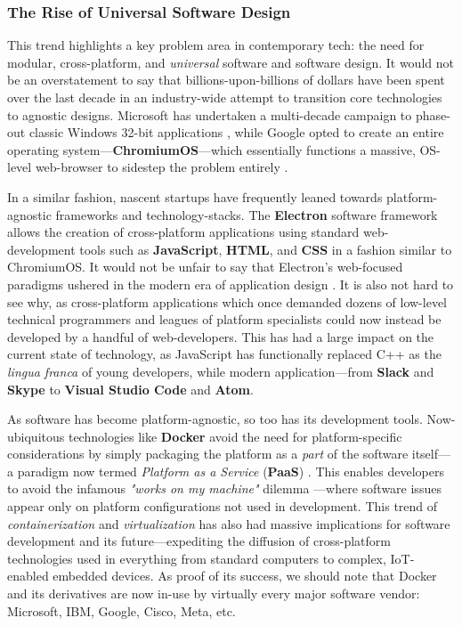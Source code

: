 \documentclass{report}
\newcommand{\tech}[1]{\textbf{#1}}
\begin{document}
\subsubsection{The Rise of Universal Software Design}

This trend highlights a key problem area in contemporary tech: the need for modular, cross-platform, and \emph{universal} software and software design. It would not be an overstatement to say that billions-upon-billions of dollars have been spent over the last decade in an industry-wide attempt to transition core technologies to agnostic designs. Microsoft has undertaken a multi-decade campaign to phase-out classic Windows 32-bit applications \cite{Foley_2020}, while Google opted to create an entire operating system---\tech{ChromiumOS}---which essentially functions a massive, OS-level web-browser to sidestep the problem entirely \cite{chrome}. 

In a similar fashion, nascent startups have frequently leaned towards platform-agnostic frameworks and technology-stacks. The \tech{Electron} software framework allows the creation of cross-platform applications using standard web-development tools such as \tech{JavaScript}, \tech{HTML}, and \tech{CSS} in a fashion similar to ChromiumOS. It would not be unfair to say that Electron's web-focused paradigms ushered in the modern era of application design \cite{Alexander_2024}. It is also not hard to see why, as cross-platform applications which once demanded dozens of low-level technical programmers and leagues of platform specialists could now instead be developed by a handful of web-developers. This has had a large impact on the current state of technology, as JavaScript has functionally replaced C++ as the \emph{lingua franca} of young developers, while modern application---from \tech{Slack} and \tech{Skype} to \tech{Visual Studio Code} and \tech{Atom}.  

As software has become platform-agnostic, so too has its development tools. Now-ubiquitous technologies like \tech{Docker} avoid the need for platform-specific considerations by simply packaging the platform as a \emph{ part} of the software itself---a paradigm now termed \emph{Platform as a Service} (\tech{PaaS}) \cite{kolb2019portability}. This enables developers to avoid the infamous \emph{"works on my machine"} dilemma \cite{Yadav_2021}---where software issues appear only on platform configurations not used in development. This trend of \emph{containerization} and \emph{virtualization} has also had massive implications for software development and its future---expediting the diffusion of cross-platform technologies used in everything from standard computers to complex, IoT-enabled embedded devices. As proof of its success, we should note that Docker and its derivatives are now in-use by virtually every major software vendor: Microsoft, IBM, Google, Cisco, Meta, etc.
\end{document}
